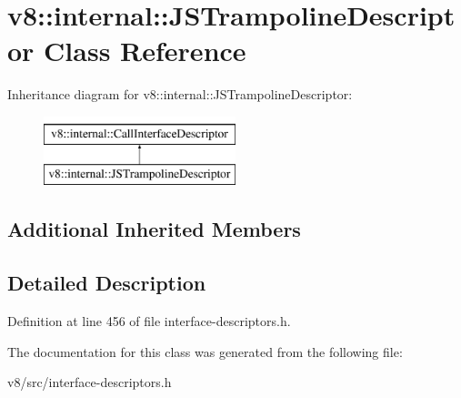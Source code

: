 \hypertarget{classv8_1_1internal_1_1JSTrampolineDescriptor}{}\section{v8\+:\+:internal\+:\+:J\+S\+Trampoline\+Descriptor Class Reference}
\label{classv8_1_1internal_1_1JSTrampolineDescriptor}
Inheritance diagram for v8\+:\+:internal\+:\+:J\+S\+Trampoline\+Descriptor\+:\begin{figure}[H]
\begin{center}
\leavevmode
\includegraphics[height=2.000000cm]{classv8_1_1internal_1_1JSTrampolineDescriptor}
\end{center}
\end{figure}
\subsection*{Additional Inherited Members}


\subsection{Detailed Description}


Definition at line 456 of file interface-\/descriptors.\+h.



The documentation for this class was generated from the following file\+:\begin{DoxyCompactItemize}
\item 
v8/src/interface-\/descriptors.\+h\end{DoxyCompactItemize}
